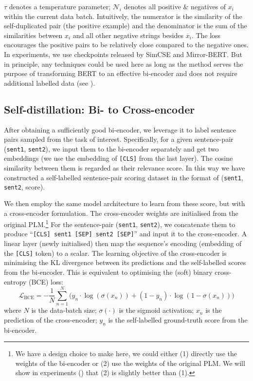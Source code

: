 \documentclass{article} \usepackage{iclr2021_conference,times}
\begin{document}
$\tau$ denotes a temperature parameter; $\mathcal{N}_i$ denotes all positive \& negatives of $x_i$ within the current data batch. Intuitively, the numerator is the similarity of the self-duplicated pair (the positive example) and the denominator is the sum of the similarities between $x_i$ and all other negative strings besides $\overline{x}_i$. The loss encourages the positive pairs to be relatively close compared to the negative ones. In experiments, we use checkpoints released by SimCSE and Mirror-BERT. But in principle, any techniques could be used here as long as the method serves the purpose of transforming BERT to an effective bi-encoder and does not require additional labelled data (see ).



\subsection{Self-distillation: Bi- to Cross-encoder}\label{sec:bi_to_cross}

After obtaining a sufficiently good bi-encoder, we leverage it to label sentence pairs sampled from the task of interest. Specifically, for a given sentence-pair (\texttt{sent1}, \texttt{sent2}), we input them to the bi-encoder separately and get two embeddings (we use the embedding of \texttt{[CLS]} from the last layer). The cosine similarity between them is regarded as their relevance score. In this way we have constructed a self-labelled sentence-pair scoring dataset in the format of (\texttt{sent1}, \texttt{sent2}, score).

We then employ the same model architecture to learn from these score, but with a cross-encoder formulation. The cross-encoder weights are initialised from the original PLM.\footnote{We have a design choice to make here, we could either (1) directly use the weights of the bi-encoder or (2) use the weights of the original PLM. We will show in experiments () that (2) is slightly better than (1).}
For the sentence-pair (\texttt{sent1}, \texttt{sent2}), we concatenate them to produce ``\texttt{[CLS] sent1  [SEP] sent2 [SEP]}'' and input it to the cross-encoder. 
A linear layer (newly initialised) then map the sequence's encoding (embedding of the \texttt{[CLS]} token) to a scalar. 
The learning objective of the cross-encoder is minimising the KL divergence between its predictions and the self-labelled scores from the bi-encoder. This is equivalent to optimising the (soft) binary cross-entropy (BCE) loss:
\begin{equation}
    \mathcal{L}_{\text{BCE}} = - \frac{1}{N}\sum_{n=1}^{N} \Big(y_n\cdot \log(\sigma(x_n)) +(1-y_n)\cdot \log(1-\sigma(x_n))\Big)
    \label{eq:bce_loss}
\end{equation}
where $N$ is the data-batch size; $\sigma(\cdot)$ is the sigmoid activation; $x_n$ is the prediction of the cross-encoder; $y_n$ is the self-labelled ground-truth score from the bi-encoder. 
\end{document}
